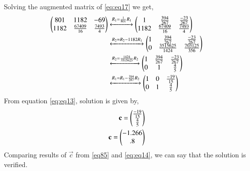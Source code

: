 \documentclass[journal,12pt,twocolumn]{IEEEtran}
\begin{document}
Solving the augmented matrix of \eqref{eq:eq17} we get,
\begin{align}
\begin{pmatrix}801&1182&-69\\1182&\frac{67409}{16}&\frac{7493}{4}\end{pmatrix} &\xleftrightarrow{R_1=\frac{1}{801}R_1}\begin{pmatrix}1&\frac{394}{267}&\frac{-23}{267}\\1182&\frac{67409}{16}&\frac{7493}{4}\end{pmatrix}\\
&\xleftrightarrow{R_2=R_2-1182R_1}\begin{pmatrix}1&\frac{394}{267}&\frac{-23}{267}\\0&\frac{3515625}{1424}&\frac{703125}{356}\end{pmatrix}\\
&\xleftrightarrow{R_2=\frac{1424}{3515625}R_2}\begin{pmatrix}1&\frac{394}{267}&\frac{-23}{267}\\0&1&\frac{4}{5}\end{pmatrix}\\
&\xleftrightarrow{R_1=R_1-\frac{394}{267}R_2}\begin{pmatrix}1&0&\frac{-19}{15}\\0&1&\frac{4}{5}\end{pmatrix}\label{eq:eq13}
\end{align}
From equation \eqref{eq:eq13}, solution is given by,
\begin{align}
\mathbf{c}=\begin{pmatrix}\frac{-19}{15}\\\frac{4}{5}\end{pmatrix}\\
\mathbf{c}=\begin{pmatrix}-1.266\\.8\end{pmatrix}\label{eq:eq14}
\end{align}
Comparing results of $\vec{c}$ from \eqref{eq85} and \eqref{eq:eq14}, we can say that the solution is verified.
\end{document}
